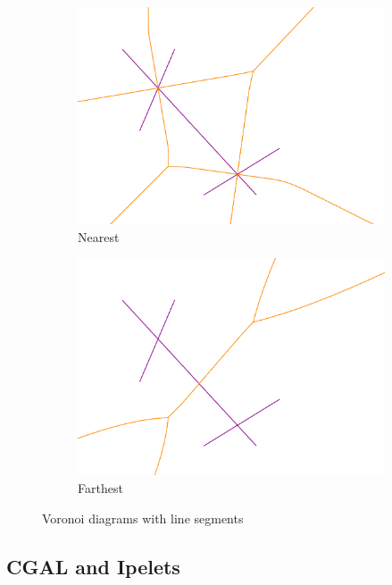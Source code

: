\documentclass[11pt,a4paper,english]{article}
\begin{document}
	\begin{figure}[h]
    \centering
    \begin{subfigure}[b]{0.45\textwidth}
        \includegraphics[width=\textwidth]{SVD_example}
        \caption{Nearest\label{fig:SVD_example}}
    \end{subfigure}
	\qquad
    \begin{subfigure}[b]{0.45\textwidth}
        \includegraphics[width=\textwidth]{FSVD_example}
        \caption{Farthest\label{fig:FSVD_example}}
    \end{subfigure}
    \caption{Voronoi diagrams with line segments\label{fig:examples}}
	\end{figure}
	
	\subsection{CGAL and Ipelets}
	
\end{document}
